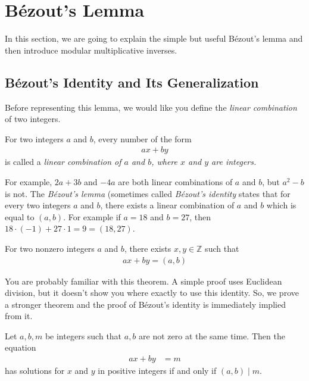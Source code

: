 \documentclass{subfile}
\begin{document}
	\section{B\'{e}zout's Lemma}

	In this section, we are going to explain the simple but useful B\'{e}zout's lemma and then introduce modular multiplicative inverses.

	\subsection{B\'{e}zout's Identity and Its Generalization}
	Before representing this lemma, we would like you define the \textit{linear combination} of two integers.

	\begin{definition}\label{def:linearcombination}
		For two integers $a$ and $b$, every number of the form
		\begin{align*} ax+by\end{align*}
		is called a \itshape{linear combination} of $a$ and $b$, where $x$ and $y$ are integers.
	\end{definition}

	For example, $2a+3b$ and $-4a$ are both linear combinations of $a$ and $b$, but $a^2-b$ is not. The \textit{B\'{e}zout's lemma} (sometimes called \textit{B\'{e}zout's identity} states that for every two integers $a$ and $b$, there exists a linear combination of $a$ and $b$ which is equal to $(a,b)$. For example if $a=18$ and $b=27$, then $18 \cdot (-1) + 27 \cdot 1 = 9 =(18,27)$.

	\begin{theorem} 
		For two nonzero integers $a$ and $b$, there exists $x, y \in \mathbb Z$ such that
		\begin{align*}
		ax+by = (a,b)
		\end{align*}
	\end{theorem}

	You are probably familiar with this theorem. A simple proof uses Euclidean division, but it doesn't show you where exactly to use this identity. So, we prove a stronger theorem and the proof of B\'{e}zout's identity is immediately implied from it.

	\begin{theorem}\label{thm:equationgcd}
		Let $a,b,m$ be integers such that $a, b$ are not zero at the same time. Then the equation
		\begin{align*}
			ax + by
				& = m
		\end{align*}
		has solutions for $x$ and $y$ in positive integers if and only if $(a,b)\mid m$.
	\end{theorem}
\end{document}
